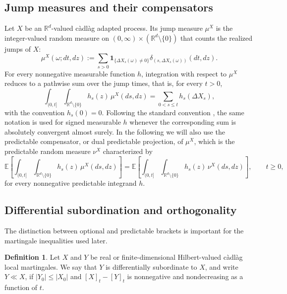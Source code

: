 \documentclass[11pt]{amsart}
\theoremstyle{definition}
\newtheorem{definition}[theorem]{Definition}
\theoremstyle{remark}
\numberwithin{equation}{section}
\newcommand{\R}{\mathbb{R}}
\newcommand{\ind}{\mathbf{1}}
\begin{document}
\subsection{Jump measures and their compensators}

Let $X$ be an $\R^d$-valued c\`adl\`ag adapted process. Its jump
measure $\mu^X$ is the integer-valued random measure on
$(0,\infty)\times(\R^d\setminus\{0\})$ that counts the realized jumps
of $X$:
\begin{equation*}
\mu^X(\omega;dt,dz)
:=
\sum_{s>0}
\ind_{\{\Delta X_s(\omega)\neq0\}}
\delta_{(s,\Delta X_s(\omega))}(dt,dz).
\end{equation*}
For every nonnegative measurable function $h$, integration with
respect to $\mu^X$ reduces to a pathwise sum over the jump times, that is, for every $t>0$,
\begin{equation*}
\int_{(0,t]}
\int_{\R^d\setminus\{0\}}
h_s(z)\,\mu^X(ds,dz)
=
\sum_{0<s\leq t}h_s(\Delta X_s),
\end{equation*}
with the convention $h_s(0)=0$.
Following the standard convention \cite{protter,cohell}, the same
notation is used for signed measurable $h$ whenever the corresponding
sum is absolutely convergent almost surely.
In the following we will also use the predictable compensator, or dual predictable projection, of
$\mu^X$, which is the predictable random measure $\nu^X$ characterized by
\begin{equation*}
\mathbb E\left[
\int_{(0,t]}
\int_{\R^d\setminus\{0\}}
h_s(z)\,\mu^X(ds,dz)
\right]
=
\mathbb E\left[
\int_{(0,t]}
\int_{\R^d\setminus\{0\}}
h_s(z)\,\nu^X(ds,dz)
\right],
\qquad t\geq0,
\end{equation*}
for every nonnegative predictable integrand $h$.

\subsection{Differential subordination and orthogonality}

The distinction between optional and predictable brackets is important
for the martingale inequalities used later.

\begin{definition}
Let $X$ and $Y$ be real or finite-dimensional Hilbert-valued c\`adl\`ag local martingales. We say that
$Y$ is differentially subordinate to $X$, and write $Y\ll X$, if
$|Y_0|\leq|X_0|$ and
$[X]_t-[Y]_t$
is nonnegative and nondecreasing as a function of $t$.
\end{definition}
\end{document}
